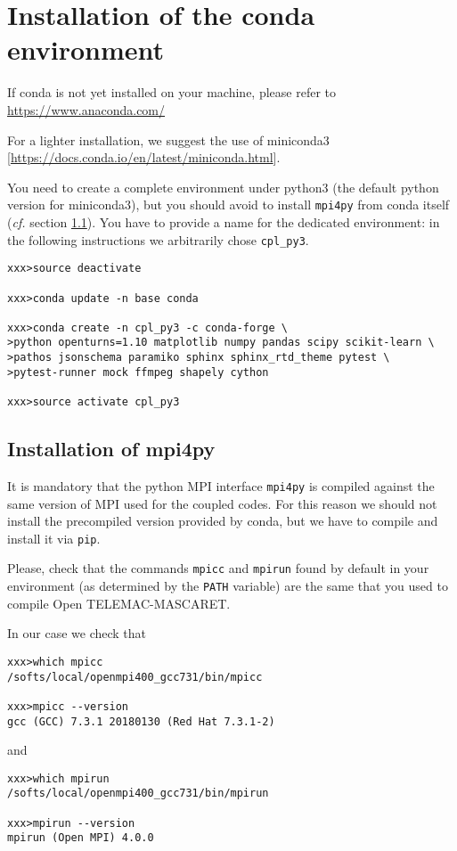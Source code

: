 \chapter{Installation of the conda
  environment}\label{ann:conda_install}

If conda is not yet installed on your machine, please refer to
\url{https://www.anaconda.com/}

For a lighter installation, we suggest the use of miniconda3
[\url{https://docs.conda.io/en/latest/miniconda.html}].
\newline

You need to create a complete environment under python3 (the default
python version for miniconda3), but you should avoid to install
\texttt{mpi4py} from conda itself ({\em cf.} section
\ref{ann:mpi4py}). You have to provide a name for the dedicated
environment: in the following instructions we arbitrarily chose \texttt{cpl\_py3}.
\begin{verbatim}
xxx>source deactivate

xxx>conda update -n base conda

xxx>conda create -n cpl_py3 -c conda-forge \
>python openturns=1.10 matplotlib numpy pandas scipy scikit-learn \
>pathos jsonschema paramiko sphinx sphinx_rtd_theme pytest \
>pytest-runner mock ffmpeg shapely cython

xxx>source activate cpl_py3
\end{verbatim}


\section{Installation of mpi4py}\label{ann:mpi4py}
It is mandatory that the python MPI interface \texttt{mpi4py} is
compiled against the same version of MPI used for the coupled
codes. For this reason we should not install the precompiled version
provided by conda, but we have to compile and install it via
\texttt{pip}.
\newline

Please, check that the commands \texttt{mpicc} and \texttt{mpirun}
found by default in your environment (as determined by the
\texttt{PATH} variable) are the same that you used to compile Open
TELEMAC-MASCARET.

In our case we check that
\begin{verbatim}
xxx>which mpicc
/softs/local/openmpi400_gcc731/bin/mpicc

xxx>mpicc --version
gcc (GCC) 7.3.1 20180130 (Red Hat 7.3.1-2)
\end{verbatim}
and
\begin{verbatim}
xxx>which mpirun
/softs/local/openmpi400_gcc731/bin/mpirun

xxx>mpirun --version
mpirun (Open MPI) 4.0.0
\end{verbatim}

